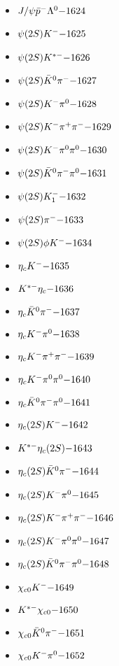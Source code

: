 \begin{multicols}{3}
\begin{itemize}
 \item $ J/\psi \bar{p}^{-} \Lambda^{0} \hfill{-1624}$
 \item $ \psi(2S) K^{-} \hfill{-1625}$
 \item $ \psi(2S) K^{*-} \hfill{-1626}$
 \item $ \psi(2S) \bar{K}^{0} \pi^{-} \hfill{-1627}$
 \item $ \psi(2S) K^{-} \pi^{0} \hfill{-1628}$
 \item $ \psi(2S) K^{-} \pi^{+} \pi^{-} \hfill{-1629}$
 \item $ \psi(2S) K^{-} \pi^{0} \pi^{0} \hfill{-1630}$
 \item $ \psi(2S) \bar{K}^{0} \pi^{-} \pi^{0} \hfill{-1631}$
 \item $ \psi(2S) K_{1}^{-} \hfill{-1632}$
 \item $ \psi(2S) \pi^{-} \hfill{-1633}$
 \item $ \psi(2S) \phi K^{-} \hfill{-1634}$
 \item $ \eta_{c} K^{-} \hfill{-1635}$
 \item $ K^{*-} \eta_{c} \hfill{-1636}$
 \item $ \eta_{c} \bar{K}^{0} \pi^{-} \hfill{-1637}$
 \item $ \eta_{c} K^{-} \pi^{0} \hfill{-1638}$
 \item $ \eta_{c} K^{-} \pi^{+} \pi^{-} \hfill{-1639}$
 \item $ \eta_{c} K^{-} \pi^{0} \pi^{0} \hfill{-1640}$
 \item $ \eta_{c} \bar{K}^{0} \pi^{-} \pi^{0} \hfill{-1641}$
 \item $ \eta_{c}(2S) K^{-} \hfill{-1642}$
 \item $ K^{*-} \eta_{c}(2S) \hfill{-1643}$
 \item $ \eta_{c}(2S) \bar{K}^{0} \pi^{-} \hfill{-1644}$
 \item $ \eta_{c}(2S) K^{-} \pi^{0} \hfill{-1645}$
 \item $ \eta_{c}(2S) K^{-} \pi^{+} \pi^{-} \hfill{-1646}$
 \item $ \eta_{c}(2S) K^{-} \pi^{0} \pi^{0} \hfill{-1647}$
 \item $ \eta_{c}(2S) \bar{K}^{0} \pi^{-} \pi^{0} \hfill{-1648}$
 \item $ \chi_{c0} K^{-} \hfill{-1649}$
 \item $ K^{*-} \chi_{c0} \hfill{-1650}$
 \item $ \chi_{c0} \bar{K}^{0} \pi^{-} \hfill{-1651}$
 \item $ \chi_{c0} K^{-} \pi^{0} \hfill{-1652}$

\end{itemize}
\end{multicols}
